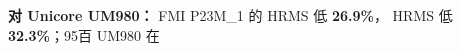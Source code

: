 \documentclass[11pt,a4paper]{article}
\numberwithin{equation}{section}
\numberwithin{figure}{section}
\begin{document}
\textbf{{\cjkfont 对}\allowbreak{} Unicore UM980{\cjkfont ：}\allowbreak{}} FMI P23M\_1 {\cjkfont 的}\allowbreak{} HRMS {\cjkfont 低}\allowbreak{} \textbf{26.9\%}{\cjkfont ，}\allowbreak{} HRMS {\cjkfont 低}\allowbreak{} \textbf{32.3\%}{\cjkfont ；}\allowbreak{}95{\cjkfont 百}\allowbreak{} UM980 {\cjkfont 在}\allowbreak{}
\end{document}
